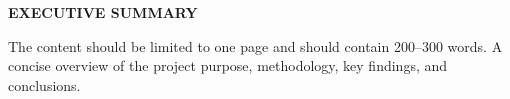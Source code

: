 \begin{center}
	\Large{\textbf{EXECUTIVE SUMMARY}}	
\end{center}
\vspace{1em}
\normalsize
\begin{justify}
	\hspace{1cm}  
	The content should be limited to one page and should contain 200–300 words. A concise overview of the project purpose, methodology, key findings, and conclusions.
\end{justify}	

